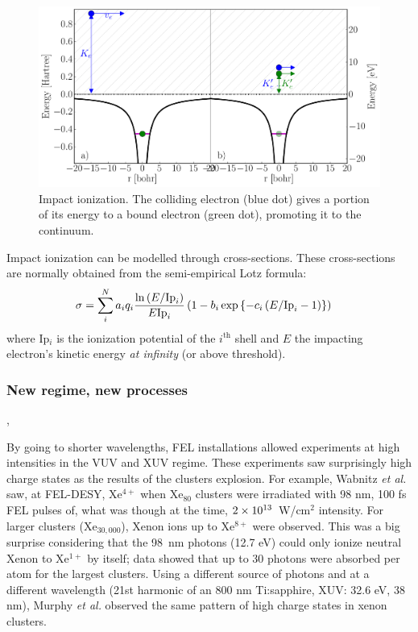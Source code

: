 \begin{figure}
 \centering
 \includegraphics[width=\figurewidth]{figures/ionization_impact}
 \caption{Impact ionization. The colliding electron (blue dot) gives a portion
          of its energy to a bound electron (green dot), promoting it to the
          continuum.}
 \label{fig:ionization:impact}
\end{figure}

Impact ionization can be modelled through cross-sections. These
cross-sections are normally obtained from the semi-empirical Lotz
formula\cite{Lotz1967}:
\begin{align}
\sigma & = \sum_{i}^{N} a_i q_i \frac{\ln{\left( E/\textrm{Ip}_i \right)}}{E \textrm{Ip}_i} \left( 1 - b_i
\exp{ \left\{ -c_i \left( E/\textrm{Ip}_i - 1 \right) \right\}} \right)
\label{eqn:impact:ionization:lotz}
\end{align}
where Ip$_i$ is the ionization potential of the $i^{\textrm{th}}$ shell and $E$
the impacting electron's kinetic energy \textit{at infinity} (or above threshold).

\subsubsection{New regime, new processes}
\label{section:intro:mechanisms:new},

By going to shorter wavelengths, FEL installations allowed experiments at high
intensities in the VUV and XUV regime. These experiments saw surprisingly
high charge states as the results of the clusters
explosion\cite{Wabnitz2002,Bostedt2010}. For example, Wabnitz \textit{et al.}
saw, at FEL-DESY, Xe$^{4+}$ when Xe$_{80}$ clusters were irradiated with 98 nm,
100 fs FEL pulses of, what was though at the time, $\ten{2}{13}$~W/cm$^2$
intensity. For larger clusters (Xe$_{30,000}$), Xenon
ions
up to
Xe$^{8+}$ were observed. This was a big surprise considering that the 98~nm
photons (12.7 eV) could only ionize neutral Xenon to Xe$^{1+}$ by itself;
data showed that up to 30 photons were absorbed per atom for the largest
clusters. Using a different source of photons and at a different wavelength
(21st harmonic of an 800 nm Ti:sapphire, XUV: 32.6 eV, 38 nm),
Murphy \textit{et al.} observed the same pattern of high charge states in xenon
clusters\cite{Murphy2008a,Murphy2008b}.

